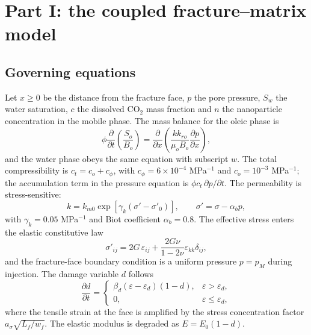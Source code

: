 \documentclass{swmcmthesis}
\begin{document}
\section{Part I: the coupled fracture--matrix model}\label{sec:p1}
\subsection{Governing equations}
Let $x\ge0$ be the distance from the fracture face, $p$ the pore pressure, $S_w$ the water saturation, $c$ the dissolved CO$_2$ mass fraction and $n$ the nanoparticle concentration in the mobile phase. The mass balance for the oleic phase is
\begin{equation}
\phi \frac{\partial}{\partial t}\left(\frac{S_o}{B_o}\right)
= \frac{\partial}{\partial x}\left(\frac{k k_{ro}}{\mu_o B_o}\frac{\partial p}{\partial x}\right),
\label{eq:oil}
\end{equation}
and the water phase obeys the same equation with subscript $w$. The total compressibility is $c_t=c_o+c_\phi$, with $c_\phi=6\times10^{-4}$ MPa$^{-1}$ and $c_o=10^{-3}$ MPa$^{-1}$; the accumulation term in the pressure equation is $\phi c_t\,\partial p/\partial t$. The permeability is stress-sensitive:
\begin{equation}
k = k_{m0}\exp\left[\gamma_k\left(\sigma'-\sigma'_0\right)\right],\qquad \sigma'=\sigma-\alpha_b p,
\label{eq:k}
\end{equation}
with $\gamma_k=0.05$ MPa$^{-1}$ and Biot coefficient $\alpha_b=0.8$. The effective stress enters the elastic constitutive law
\begin{equation}
\sigma'_{ij}=2G\,\varepsilon_{ij}+\frac{2G\nu}{1-2\nu}\varepsilon_{kk}\delta_{ij},
\label{eq:hooke}
\end{equation}
and the fracture-face boundary condition is a uniform pressure $p=p_{M}$ during injection. The damage variable $d$ follows
\begin{equation}
\frac{\partial d}{\partial t}=
\begin{cases}
\beta_d\left(\varepsilon-\varepsilon_d\right)\left(1-d\right), & \varepsilon>\varepsilon_d,\\[2pt]
0, & \varepsilon\le\varepsilon_d,
\end{cases}
\label{eq:damage}
\end{equation}
where the tensile strain at the face is amplified by the stress concentration factor $a_\sigma\sqrt{L_f/w_f}$. The elastic modulus is degraded as $E=E_0(1-d)$.
\end{document}

